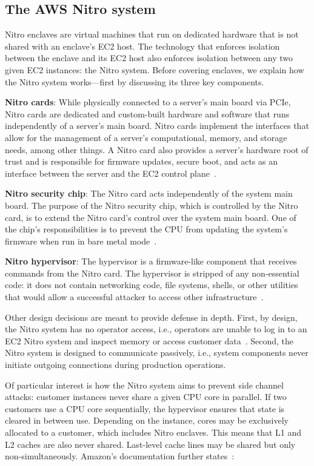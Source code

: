 \subsection{The AWS Nitro system}%
\label{sec:nitro}

Nitro enclaves are virtual machines that run on dedicated hardware that is not
shared with an enclave's EC2 host.  The technology that enforces isolation
between the enclave and its EC2 host also enforces isolation between any two
given EC2 instances: the Nitro system.  Before covering enclaves, we explain how
the Nitro system works---first by discussing its three key components.

\textbf{Nitro cards}: While physically connected to a server's main board via
PCIe, Nitro cards are dedicated and custom-built hardware and software that runs
independently of a server's main board.  Nitro cards implement the interfaces
that allow for the management of a server's computational, memory, and storage
needs, among other things.  A Nitro card also provides a server's hardware root
of trust and is responsible for firmware updates, secure boot, and acts as an
interface between the server and the EC2 control plane~\cite[pp.
7--10]{Bean2022a}.

\textbf{Nitro security chip}: The Nitro card acts independently of the system main
board.  The purpose of the Nitro security chip, which is controlled by the Nitro
card, is to extend the Nitro card's control over the system main board.  One of
the chip's responsibilities is to prevent the CPU from updating the system's
firmware when run in bare metal mode~\cite[pp.~10--11]{Bean2022a}.

\textbf{Nitro hypervisor}:
The hypervisor is a firmware-like component that receives commands from the
Nitro card.  The hypervisor is stripped of any non-essential code: it does not
contain networking code, file systems, shells, or other utilities that would
allow a successful attacker to access other
infrastructure~\cite[pp.~11--12]{Bean2022a}.

Other design decisions are meant to provide defense in depth.  First, by
design, the Nitro system has no operator access, i.e., operators are unable to
log in to an EC2 Nitro system and inspect memory or access customer
data~\cite[p.~15]{Bean2022a}. Second, the Nitro system is designed to
communicate passively, i.e., system components never initiate outgoing
connections during production operations.

Of particular interest is how the Nitro system aims to prevent side channel
attacks: customer instances never share a given CPU core in parallel.  If two
customers use a CPU core sequentially, the hypervisor ensures that state is
cleared in between use.  Depending on the instance, cores may be exclusively
allocated to a customer, which includes Nitro enclaves.  This means that L1 and
L2 caches are also never shared.  Last-level cache lines may be shared but only
non-simultaneously.  Amazon's documentation further
states~\cite[p.~19]{Bean2022a}:

